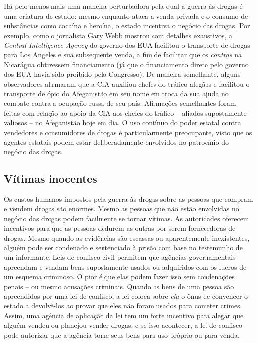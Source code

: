 Há pelo menos mais uma maneira perturbadora pela qual a guerra às drogas é uma criatura do estado: mesmo enquanto ataca a venda privada e o consumo de substâncias como cocaína e heroína, o estado incentiva o negócio das drogas. Por exemplo, como o jornalista Gary Webb mostrou com detalhes exaustivos, a \emph{Central Intelligence Agency} do governo dos EUA facilitou o transporte de drogas para Los Angeles e sua subsequente venda, a fim de facilitar que os \emph{contras} na Nicarágua obtivessem financiamento (já que o financiamento direto pelo governo dos EUA havia sido proibido pelo Congresso). De maneira semelhante, alguns observadores afirmaram que a CIA auxiliou chefes do tráfico afegãos e facilitou o transporte de ópio do Afeganistão em seu nome em troca da sua ajuda no combate contra a ocupação russa de seu país. Afirmações semelhantes foram feitas com relação ao apoio da CIA aos chefes do tráfico -- aliados supostamente valiosos -- no Afeganistão hoje em dia. O uso contínuo do poder estatal contra vendedores e consumidores de drogas é particularmente preocupante, visto que os agentes estatais podem estar deliberadamente envolvidos no patrocínio do negócio das drogas.

\subsection*{Vítimas inocentes}

Os custos humanos impostos pela guerra às drogas sobre as pessoas que compram e vendem drogas são enormes. Mesmo as pessoas que não estão envolvidas no negócio das drogas podem facilmente se tornar vítimas. As autoridades oferecem incentivos para que as pessoas dedurem as outras por serem fornecedoras de drogas. Mesmo quando as evidências são escassas ou aparentemente inexistentes, alguém pode ser condenado e sentenciado à prisão com base no testemunho de um informante. Leis de confisco civil permitem que agências governamentais apreendam e vendam bens supostamente usados ou adquiridos com os lucros de um esquema criminoso. O pior é que elas podem fazer isso sem condenações penais -- ou mesmo acusações criminais. Quando os bens de uma pessoa são apreendidos por uma lei de confisco, a lei coloca sobre \emph{ela} o ônus de convencer o estado a devolvê-los ao provar que eles não foram usados para cometer crimes. Assim, uma agência de aplicação da lei tem um forte incentivo para alegar que alguém vendeu ou planejou vender drogas; e se isso acontecer, a lei de confisco pode autorizar que a agência tome seus bens para uso próprio ou para venda.

